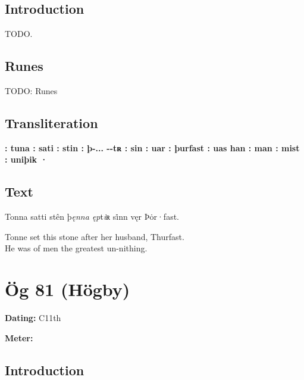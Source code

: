 \subsection{Introduction}

TODO.

\subsection{Runes}

TODO: Runes%

\subsection{Transliteration}

\textbf{: tuna : sati : stin : þ-... {}-{}-tʀ : sin : uar : þurfast : uas han : man : mist : uniþik ·}

\subsection{Text}

\bpg\bpa[0]%
\startsub Tonna satti stên þ\emph{ęnna ęp}t\emph{i}ʀ si̇nn vęr Þȯr·fast.\endsub \\
 \epa

\bpb Tonne set this stone after her husband, Thurfast. \\
He was of men the greatest un-nithing.\epb\epg

\sectionline\clearpage


\section{Ög 81 (Högby)}

\begin{flushright}%
\textbf{Dating:} C11th

\textbf{Meter:} \Fornyrdislag
\end{flushright}%

\subsection{Introduction}

